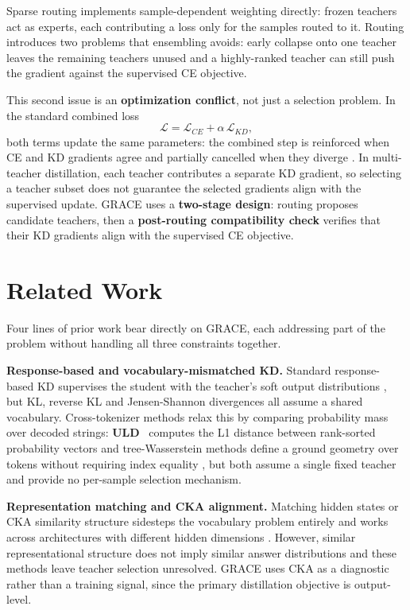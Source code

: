 Sparse routing implements sample-dependent weighting directly: frozen teachers
act as experts, each contributing a loss only for the samples routed to it. Routing introduces two problems that ensembling avoids: early collapse onto
one teacher leaves the remaining teachers unused and a highly-ranked
teacher can still push the gradient against the supervised CE objective.

This second issue is an \textbf{optimization conflict}, not just a selection
problem. In the standard combined loss
\[
\mathcal{L} = \mathcal{L}_{CE} + \alpha\,\mathcal{L}_{KD},
\]
both terms update the same parameters: the combined step is reinforced when
CE and KD gradients agree and partially cancelled when they diverge
\cite{zhu2021studentcustomized,yu2020gradient}. In multi-teacher distillation,
each teacher contributes a separate KD gradient, so selecting a teacher subset does not guarantee the selected gradients align
with the supervised update. GRACE uses a \textbf{two-stage design}: routing proposes
candidate teachers, then a \textbf{post-routing compatibility check} verifies that
their KD gradients align with the supervised CE objective.

\section{Related Work}
\label{sec:related-work-gap}

Four lines of prior work bear directly on GRACE, each addressing part of the
problem without handling all three constraints together.

\textbf{Response-based and vocabulary-mismatched KD.}
Standard response-based KD supervises the student with the teacher's soft
output distributions
\cite{hinton2015distillingknowledgeneuralnetwork,xu2024surveyknowledgedistillationlarge,fang2021compressingvlm},
but KL, reverse KL and Jensen-Shannon divergences all assume a shared
vocabulary. Cross-tokenizer methods relax this by comparing probability mass
over decoded strings: \textbf{ULD}~\cite{boizard2024towardscrosstokenizerdistillation}
computes the L1 distance between rank-sorted probability vectors and
tree-Wasserstein methods define a ground geometry over tokens without
requiring index equality
\cite{takezawa2021supervisedtreewasserstein,leyamadafukumizucuturi2019treesliced},
but both assume a single fixed teacher and provide no per-sample selection
mechanism.

\textbf{Representation matching and CKA alignment.}
Matching hidden states or CKA similarity structure sidesteps the vocabulary
problem entirely and works across architectures with different hidden
dimensions \cite{kornblith2019similarityrepresentations,dasgupta2025improving}.
However, similar representational structure does not imply similar answer
distributions and these methods leave teacher selection unresolved. GRACE uses
CKA as a diagnostic rather than a training signal, since the primary
distillation objective is output-level.

